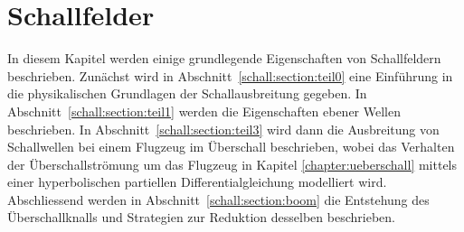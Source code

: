 %
%
%
%
\chapter{Schallfelder\label{chapter:schall}}
\begin{refsection}
%
%

\begin{comment}
Ein paar Hinweise für die korrekte Formatierung des Textes
\begin{itemize}
\item
Absätze werden gebildet, indem man eine Leerzeile einfügt.
Die Verwendung von \verb+\\+ ist nur in Tabellen und Arrays gestattet.
\item
Die explizite Platzierung von Bildern ist nicht erlaubt, entsprechende
Optionen werden gelöscht. 
Verwenden Sie Labels und Verweise, um auf Bilder hinzuweisen.
\item
Beginnen Sie jeden Satz auf einer neuen Zeile. 
Damit ermöglichen Sie dem Versionsverwaltungssysteme, Änderungen
in verschiedenen Sätzen von verschiedenen Autoren ohne Konflikt 
anzuwenden.
\item 
Bilden Sie auch für Formeln kurze Zeilen, einerseits der besseren
Übersicht wegen, aber auch um GIT die Arbeit zu erleichtern.
\end{itemize}

\end{comment}

\noindent
In diesem Kapitel werden einige grundlegende Eigenschaften von
Schallfeldern beschrieben.
Zunächst wird in Abschnitt~\ref{schall:section:teil0} eine Einführung
in die physikalischen Grundlagen der Schallausbreitung gegeben.
In Abschnitt~\ref{schall:section:teil1} werden die Eigenschaften
ebener Wellen beschrieben.
In Abschnitt~\ref{schall:section:teil3} wird dann die Ausbreitung
von Schallwellen bei einem Flugzeug im Überschall beschrieben,
wobei das Verhalten der Überschallströmung um das Flugzeug in Kapitel
\ref{chapter:ueberschall} mittels einer hyperbolischen
partiellen Differentialgleichung modelliert wird.
Abschliessend werden in Abschnitt~\ref{schall:section:boom} die
Entstehung des Überschallknalls und Strategien zur Reduktion desselben
beschrieben.



% 



\printbibliography[heading=subbibliography]
\end{refsection}
